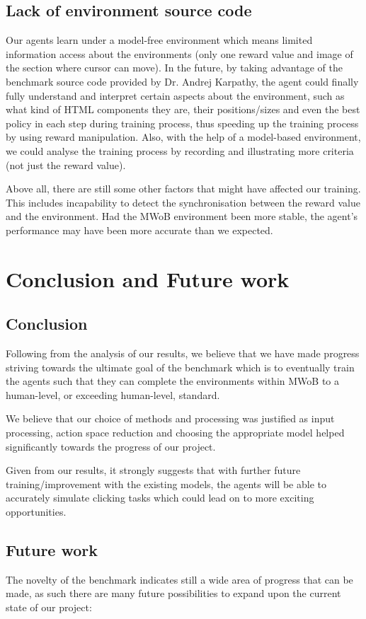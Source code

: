\documentclass[10pt,journal,compsoc]{IEEEtran}
\begin{document}
\subsection{Lack of environment source code}
Our agents learn under a model-free environment which means limited information access about the environments (only one reward value and image of the section where cursor can move). In the future, by taking advantage of the benchmark source code provided by Dr. Andrej Karpathy, the agent could finally fully understand and interpret certain aspects about the environment, such as what kind of HTML components they are, their positions/sizes and even the best policy in each step during training process, thus speeding up the training process by using reward manipulation. Also, with the help of a model-based environment, we could analyse the training process by recording and illustrating more criteria (not just the reward value). 

Above all, there are still some other factors that might have affected our training. This includes incapability to detect the synchronisation between the reward value and the environment. Had the MWoB environment been more stable, the agent’s performance may have been more accurate than we expected.

\section{Conclusion and Future work}
\subsection{Conclusion}
Following from the analysis of our results, we believe that we have made progress striving towards the ultimate goal of the benchmark which is to eventually train the agents such that they can complete the environments within MWoB to a human-level, or exceeding human-level, standard. 

We believe that our choice of methods and processing was justified as input processing, action space reduction and choosing the appropriate model helped significantly towards the progress of our project.

Given from our results, it strongly suggests that with further future training/improvement with the existing models, the agents will be able to accurately simulate clicking tasks which could lead on to more exciting opportunities. 
 
\subsection{Future work}
The novelty of the benchmark indicates still a wide area of progress that can be made, as such there are many future possibilities to expand upon the current state of our project:
\end{document}
